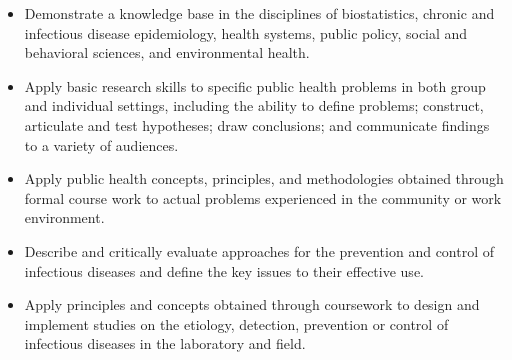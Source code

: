 \documentclass{article}
\begin{document}
\begin{itemize}
	\item Demonstrate a knowledge base in the disciplines of biostatistics, chronic and infectious disease epidemiology, health systems, public policy, social and behavioral sciences, and environmental health.
	\item Apply basic research skills to specific public health problems in both group and individual settings, including the ability to define problems; construct, articulate and test hypotheses; draw conclusions; and communicate findings to a variety of audiences.
	\item Apply public health concepts, principles, and methodologies obtained through formal course work to actual problems experienced in the community or work environment.
	\item Describe and critically evaluate approaches for the prevention and control of infectious diseases and define the key issues to their effective use.
	\item Apply principles and concepts obtained through coursework to design and implement studies on the etiology, detection, prevention or control of infectious diseases in the laboratory and field.
\end{itemize}

\printbibliography
	
\end{document}
